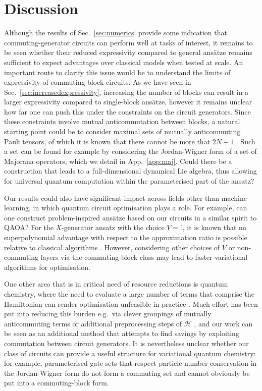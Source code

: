 \documentclass[twocolumn]{revtex4-2}
\begin{document}
\section{Discussion}
Although the results of Sec.\ \ref{sec:numerics} provide some indication that commuting-generator circuits can perform well at tasks of interest, it remains to be seen whether their reduced expressivity compared to general ans\"{a}tze remains sufficient to expect advantages over classical models when tested at scale. An important route to clarify this issue would be to understand the limits of expressivity of commuting-block circuits. As we have seen in Sec.\ \ref{sec:increasedexpressivity}, increasing the number of blocks can result in a larger expressivity compared to single-block ans\"{a}tze, however it remains unclear how far one can push this under the constraints on the circuit generators. Since these constraints involve mutual anticommutation between blocks, a natural starting point could be to consider maximal sets of mutually anticommuting Pauli tensors, of which it is known that there cannot be more that $2N+1$ \cite{sarkar2021sets}. Such a set can be found for example by considering the Jordan-Wigner form of a set of Majorana operators, which we detail in App.\ \ref{app:maj}. Could there be a construction that leads to a full-dimensional dynamical Lie algebra, thus allowing for universal quantum computation within the parameterised part of the ansatz? 

Our results could also have significant impact across fields other than machine learning, in which quantum circuit optimisation plays a role. For example, can one construct problem-inspired ans\"{a}tze based on our circuits in a similar spirit to QAOA? For the $X$-generator ansatz with the choice $V=\mathbb{I}$, it is known that no superpolynomial advantage with respect to the approximation ratio is possible relative to classical algorithms \cite{lee2021progress}. However, considering other choices of $V$ or non-commuting layers via the commuting-block class may lead to faster variational algorithms for optimisation. 

One other area that is in critical need of resource reductions is quantum chemistry, where the need to evaluate a large number of terms that comprise the Hamiltonian can render optimisation unfeasible in practice \cite{vqe_review}. Much effort has been put into reducing this burden e.g.~via clever groupings of mutually anticommuting terms \cite{Verteletskyi_Izmaylov_20,Yen_Izmaylov_20} or additional preprocessing steps of $\mathcal{H}$ \cite{Huggins_Babbush_21}, and our work can be seen as an additional method that attempts to find savings by exploiting commutation between circuit generators. It is nevertheless unclear whether our class of circuits can provide a useful structure for variational quantum chemistry: for example, parameterised gate sets that respect particle-number conservation in the Jordan-Wigner form do not form a commuting set and cannot obviously be put into a commuting-block form. 
\end{document}

